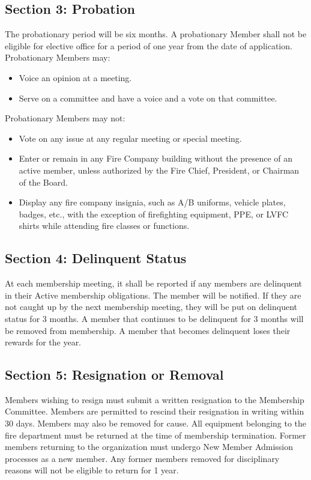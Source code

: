 ﻿\documentclass[12pt,letterpaper]{article}
\begin{document}
\subsection*{Section 3: Probation}
The probationary period will be six months.  A probationary Member shall not be eligible for elective office for a period of one year from the date of application.
Probationary Members may:
\begin{itemize}
\item Voice an opinion at a meeting.
\item Serve on a committee and have a voice and a vote on that committee.
\end{itemize}
Probationary Members may not: 
\begin{itemize}
\item Vote on any issue at any regular meeting or special meeting.
\item Enter or remain in any Fire Company building without the presence of an active member, unless authorized by the Fire Chief, President, or Chairman of the Board. 
\item Display any fire company insignia, such as A/B uniforms, vehicle plates, badges, etc., with the exception of firefighting equipment, PPE, or LVFC shirts while attending fire classes or functions.
\end{itemize}

\subsection*{Section 4: Delinquent Status}
At each membership meeting, it shall be reported if any members are delinquent in their Active membership obligations.  The member will be notified.  If they are not caught up by the next membership meeting, they will be put on delinquent status for 3 months.  A member that continues to be delinquent for 3 months will be removed from membership.  A member that becomes delinquent loses their rewards for the year.

\subsection*{Section 5: Resignation or Removal}
Members wishing to resign must submit a written resignation to the Membership Committee.  Members are permitted to rescind their resignation in writing within 30 days.  Members may also be removed for cause.  All equipment belonging to the fire department must be returned at the time of membership termination.  Former members returning to the organization must undergo New Member Admission processes as a new member.  Any former members removed for disciplinary reasons will not be eligible to return for 1 year.
\end{document}
